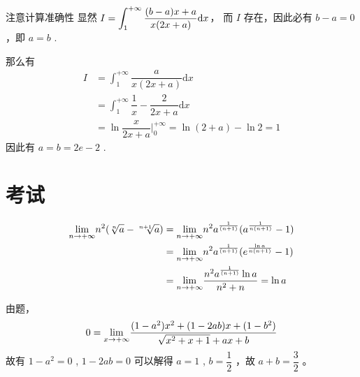 \begin{answer}[660T68]{注意计算准确性}
    显然 $\displaystyle I = \int_1^{+\infty} \dfrac{(b-a)x + a}{x(2x+a)}\mathrm{d}x$，
    而 $ I $ 存在，因此必有 $ b - a = 0 $，即 $ a = b $ .

    那么有\begin{equation*}
        \begin{aligned}
            I &= \int_1^{+\infty} \dfrac{a}{x(2x+a)}\mathrm{d}x \\&=
            \int_1^{+\infty} \dfrac{1}{x} - \dfrac{2}{2x+a} \mathrm{d}x\\&=
            \ln \dfrac{x}{2x+a}\Big|^{+\infty}_0 = \ln(2+a) - \ln 2 = 1
        \end{aligned}
    \end{equation*} 
    因此有 $ a = b = 2e-2 $ .
\end{answer}


\section{考试}

\begin{Answer}
    \begin{equation*}
        \begin{aligned}
            \displaystyle {\displaystyle\lim_{n\rightarrow +\infty}}n^2(\sqrt[n]a-\sqrt[n+1]a)
            &= {\displaystyle\lim_{n\rightarrow +\infty}}n^2a^{\frac1{(n+1)}}(a^{\frac1{n(n+1)}}-1)\\ 
            &= {\displaystyle\lim_{n\rightarrow +\infty}}n^2a^{\frac1{(n+1)}}(e^{\frac{\ln a}{n(n+1)}}-1)\\ 
            &= {\displaystyle\lim_{n\rightarrow +\infty}}\frac{n^2a^{\frac1{(n+1)}}\ln a}{n^2+n} = \ln a
        \end{aligned}
    \end{equation*}    
\end{Answer}

\begin{Answer}
    由题，
    $$
       0 =  {\displaystyle\lim_{x\rightarrow +\infty}} 
       \displaystyle\frac{(1-a^2)x^2+(1-2ab)x+(1-b^2)}{\sqrt{x^2+x+1}+ax+b}
    $$ 
    故有 $ 1-a^2 = 0 $ , $ 1-2ab = 0 $ 
    可以解得 $ a=1 $ , $ b = \dfrac{1}{2} $ ，故 $ a+b=\dfrac{3}{2} $ 。
\end{Answer}

